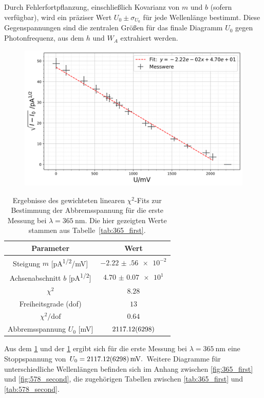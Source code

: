 Durch Fehlerfortpflanzung, einschließlich Kovarianz von $m$ und $b$ (sofern verfügbar), wird ein präziser Wert $U_{0}\pm\sigma_{U_{0}}$ für jede Wellenlänge bestimmt. Diese Gegenspannungen sind die zentralen Größen für das finale Diagramm $U_{0}$ gegen Photonfrequenz, aus dem $h$ und $W_{A}$ extrahiert werden.
\FloatBarrier
\begin{figure}[H]
    \centering
    \includegraphics[width=0.95\linewidth]{figs/365_1.png}
    \label{fig:365_first_photoeff}
\end{figure}
\begin{table}[H]
  \centering
  \begin{tabular}{|c|c|}
    \hline
    \textbf{Parameter} & \textbf{Wert} \\ \hline
    Steigung $m$ [\si{\pico\ampere^{1/2}/\milli\volt}]
      & $\num{-2.22(56)e-2}$ \\ \hline
    Achsenabschnitt $b$ [\si{\pico\ampere^{1/2}}]
      & $\num{4.70(7)e1}$ \\ \hline
    $\chi^2$
      & $\num{8.28}$ \\ \hline
    Freiheitsgrade (dof)
      & $\num{13}$ \\ \hline
    $\chi^2/\mathrm{dof}$
      & $\num{0.64}$ \\ \hline
    Abbremsspannung $U_0$ [\si{\milli\volt}]
      & $\num{2117.12 \pm 62.98}$ \\ \hline
  \end{tabular}
  \caption{Ergebnisse des gewichteten linearen $\chi^2$-Fits zur Bestimmung der Abbremsspannung für die erste Messung bei $\lambda=\SI{365}{\nano\metre}$. Die hier gezeigten Werte stammen aus Tabelle~\ref{tab:365_first}.}
  \label{tab:365_first_chi2_photoeff}
\end{table}
\FloatBarrier
Aus dem \cref{fig:365_first_photoeff} und der \cref{tab:365_first_chi2_photoeff} ergibt sich für die erste Messung bei $\lambda = \SI{365}{\nano\meter}$ eine Stoppspannung von $U_0 = \SI{2117.12 \pm 62.98}{\milli\volt}.$ Weitere Diagramme für unterschiedliche Wellenlängen befinden sich im Anhang zwischen \cref{fig:365_first} und \cref{fig:578_second}, die zugehörigen Tabellen zwischen \cref{tab:365_first} und \cref{tab:578_second}.\\



